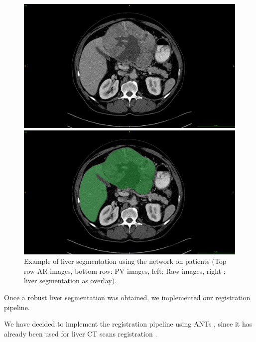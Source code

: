 \begin{figure}[ht!]
\vspace{0.8cm}
\begin{minipage}{0.45\linewidth}
\includegraphics[width=0.9\linewidth]{./images/TCIA_CECTLiver_prediction_TCGA-DD-A11A_slice42_raw}
\end{minipage}
\hspace{0.3cm}
\begin{minipage}{0.45\linewidth}
\includegraphics[width=0.9\linewidth]{./images/TCIA_CECTLiver_prediction_TCGA-DD-A11A_slice42_greenLiver}
\end{minipage}
\caption{Example of liver segmentation using the  network on 
patients (Top row AR images, bottom row: PV images, left:
Raw images, right : liver segmentation as overlay).}
\label{fig:LiverPredTciaDb}
\end{figure}



Once a robust liver segmentation was obtained, we implemented our
registration pipeline.

We have decided to implement the registration pipeline using ANTs \cite{avants2009advanced}, since it has already been used for liver
CT scans registration \cite{Zhao2019,Zhao2020}.

